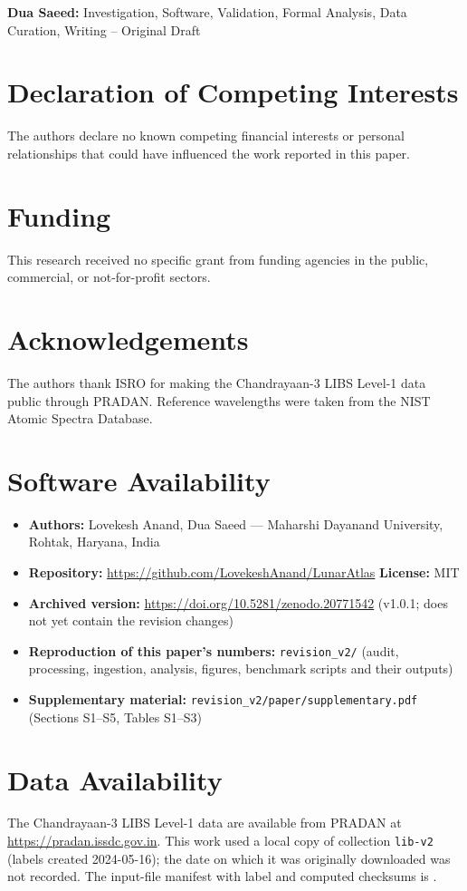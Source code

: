 \documentclass[final,5p,twocolumn,a4paper]{elsarticle}
\begin{document}
\textbf{Dua Saeed:} Investigation, Software, Validation, Formal Analysis, Data Curation, Writing -- Original Draft

\section*{Declaration of Competing Interests}
The authors declare no known competing financial interests or personal relationships that could have influenced the work reported in this paper.

\section*{Funding}
This research received no specific grant from funding agencies in the public, commercial, or not-for-profit sectors.

\section*{Acknowledgements}
The authors thank ISRO for making the Chandrayaan-3 LIBS Level-1 data public through PRADAN. Reference wavelengths were taken from the NIST Atomic Spectra Database.

\section*{Software Availability}
\begin{itemize}
    \item \textbf{Authors:} Lovekesh Anand, Dua Saeed --- Maharshi Dayanand University, Rohtak, Haryana, India
    \item \textbf{Repository:} \url{https://github.com/LovekeshAnand/LunarAtlas} \quad \textbf{License:} MIT
    \item \textbf{Archived version:} \url{https://doi.org/10.5281/zenodo.20771542} (v1.0.1; does not yet contain the revision changes) \cite{lunaratlas_zenodo}
    \item \textbf{Reproduction of this paper's numbers:} \texttt{revision\_v2/} (audit, processing, ingestion, analysis, figures, benchmark scripts and their outputs)
    \item \textbf{Supplementary material:} \texttt{revision\_v2/paper/supplementary.pdf} (Sections S1--S5, Tables S1--S3)
\end{itemize}

\section*{Data Availability}
The Chandrayaan-3 LIBS Level-1 data are available from PRADAN at \url{https://pradan.issdc.gov.in}. This work used a local copy of collection \texttt{lib-v2} (labels created 2024-05-16); the date on which it was originally downloaded was not recorded. The input-file manifest with label and computed checksums is .
\end{document}
